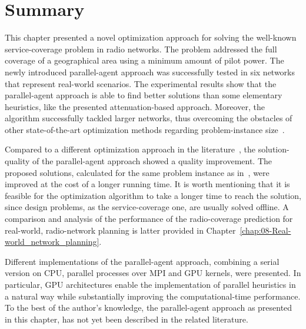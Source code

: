 \section{Summary}

This chapter presented a novel optimization approach for solving the
well-known service-coverage problem in radio networks. The problem
addressed the full coverage of a geographical area using a minimum
amount of pilot power. The newly introduced parallel-agent approach
was successfully tested in six networks that represent real-world
scenarios. The experimental results show that the parallel-agent approach
is able to find better solutions than some elementary heuristics,
like the presented attenuation-based approach. Moreover, the algorithm
successfully tackled larger networks, thus overcoming the obstacles
of other state-of-the-art optimization methods regarding problem-instance
size~\cite{Siomina_Pilot.power.optimization:2004,Siomina:Minimum.pilot.power.for.service.coverage}.

Compared to a different optimization approach in the literature~\cite{Siomina-Minimum_pilot_power_for_service_coverage:2007},
the solution-quality of the parallel-agent approach showed a quality
improvement. The proposed solutions, calculated for the same problem
instance as in~\cite{Siomina:Minimum.pilot.power.for.service.coverage},
were improved at the cost of a longer running time. It is worth mentioning
that it is feasible for the optimization algorithm to take a longer
time to reach the solution, since design problems, as the service-coverage
one, are usually solved offline. A comparison and analysis of the
performance of the radio-coverage prediction for real-world, radio-network
planning is latter provided in Chapter~\ref{chap:08-Real-world_network_planning}.

Different implementations of the parallel-agent approach, combining
a serial version on CPU, parallel processes over MPI and GPU kernels,
were presented. In particular, GPU architectures enable the implementation
of parallel heuristics in a natural way while substantially improving
the computational-time performance. To the best of the author's knowledge,
the parallel-agent approach as presented in this chapter, has not
yet been described in the related literature.
